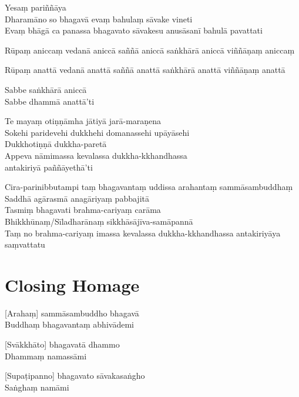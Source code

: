Yesaṃ pariññāya\\
Dharamāno so bhagavā evaṃ bahulaṃ sāvake vineti\\
Evaṃ bhāgā ca panassa bhagavato sāvakesu anusāsanī bahulā pavattati

Rūpaṃ aniccaṃ vedanā aniccā saññā aniccā saṅkhārā aniccā viññāṇaṃ aniccaṃ

Rūpaṃ anattā vedanā anattā saññā anattā saṅkhārā anattā viññāṇaṃ anattā

Sabbe saṅkhārā aniccā\\
Sabbe dhammā anattā'ti

Te mayaṃ otiṇṇāmha jātiyā jarā-maraṇena\\
Sokehi paridevehi dukkhehi domanassehi upāyāsehi\\
Dukkhotiṇṇā dukkha-paretā\\
Appeva nāmimassa kevalassa dukkha-kkhandhassa\\
antakiriyā paññāyethā'ti

Cira-parinibbutampi taṃ bhagavantaṃ uddissa arahantaṃ sammāsambuddhaṃ\\
Saddhā agārasmā anagāriyaṃ pabbajitā\\
Tasmiṃ bhagavati brahma-cariyaṃ carāma\\
Bhikkhūnaṃ/Sīladharānaṃ sikkhāsājīva-samāpannā\\
Taṃ no brahma-cariyaṃ imassa kevalassa dukkha-kkhandhassa antakiriyāya saṃvattatu

\section*{Closing Homage}

[Arahaṃ] sammāsambuddho bhagavā\\
Buddhaṃ bhagavantaṃ abhivādemi

[Svākkhāto] bhagavatā dhammo\\
Dhammaṃ namassāmi

[Supaṭipanno] bhagavato sāvakasaṅgho\\
Saṅghaṃ namāmi

